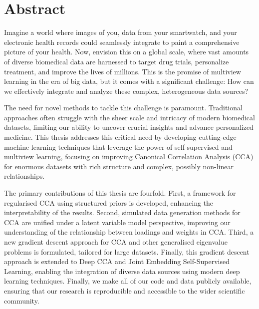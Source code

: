 \chapter*{Abstract}

Imagine a world where images of you, data from your smartwatch, and your electronic health records could seamlessly integrate to paint a comprehensive picture of your health. Now, envision this on a global scale, where vast amounts of diverse biomedical data are harnessed to target drug trials, personalize treatment, and improve the lives of millions. This is the promise of multiview learning in the era of big data, but it comes with a significant challenge: How can we effectively integrate and analyze these complex, heterogeneous data sources?

The need for novel methods to tackle this challenge is paramount. Traditional approaches often struggle with the sheer scale and intricacy of modern biomedical datasets, limiting our ability to uncover crucial insights and advance personalized medicine. This thesis addresses this critical need by developing cutting-edge machine learning techniques that leverage the power of self-supervised and multiview learning, focusing on improving Canonical Correlation Analysis (CCA) for enormous datasets with rich structure and complex, possibly non-linear relationships.

The primary contributions of this thesis are fourfold. First, a framework for regularised CCA using structured priors is developed, enhancing the interpretability of the results. Second, simulated data generation methods for CCA are unified under a latent variable model perspective, improving our understanding of the relationship between loadings and weights in CCA. Third, a new gradient descent approach for CCA and other generalised eigenvalue problems is formulated, tailored for large datasets. Finally, this gradient descent approach is extended to Deep CCA and Joint Embedding Self-Supervised Learning, enabling the integration of diverse data sources using modern deep learning techniques. Finally, we make all of our code and data publicly available, ensuring that our research is reproducible and accessible to the wider scientific community.